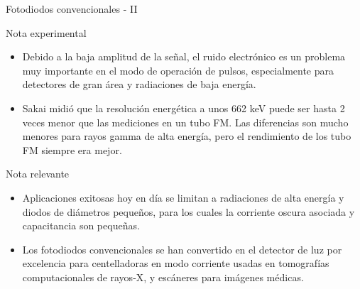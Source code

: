 \documentclass[a4paper,10pt]{beamer}
\begin{document}
\begin{frame}{Fotodiodos convencionales - II}
 
 \begin{exampleblock}{Nota experimental}
  
  \begin{itemize}
   \item \begin{justify}
          Debido a la baja amplitud de la señal, el ruido electrónico es un problema 
          muy importante en el modo de operación de pulsos, especialmente para detectores 
          de gran área y radiaciones de baja energía.
         \end{justify}
    \item \begin{justify}
          Sakai midió que la resolución energética a unos 662 keV puede ser hasta 2 veces menor que 
          las mediciones en un tubo FM. Las diferencias son mucho menores para rayos 
          gamma de alta energía, pero el rendimiento de los tubo FM siempre era mejor.
         \end{justify}
  \end{itemize}  
 \end{exampleblock}

 \begin{block}{Nota relevante}
 \begin{itemize}
  \item \begin{justify}
          Aplicaciones exitosas hoy en día se limitan a radiaciones de alta energía 
          y diodos de diámetros pequeños, para los cuales la corriente oscura asociada 
          y capacitancia son pequeñas.
         \end{justify}
 \item  \begin{justify}
          Los fotodiodos convencionales se han convertido en el detector de luz
          por excelencia para centelladoras en modo corriente usadas en tomografías 
          computacionales de rayos-X, y escáneres para imágenes médicas.
         \end{justify}
 \end{itemize}
 \end{block}
\end{frame}
\end{document}
